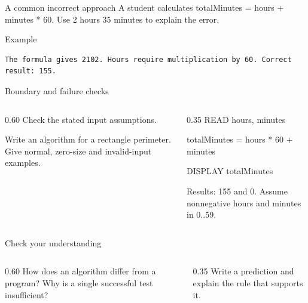 \documentclass[10pt,aspectratio=169]{beamer}
\begin{document}
\begin{frame}[fragile,t]{A common incorrect approach}
A student calculates totalMinutes = hours + minutes * 60. Use 2 hours 35 minutes to explain the error.
\vspace{1mm}\begin{block}{Example}
\begin{lstlisting}
The formula gives 2102. Hours require multiplication by 60. Correct result: 155.
\end{lstlisting}
\end{block}
\end{frame}

\begin{frame}[fragile,t]{Boundary and failure checks}
\begin{columns}[T,onlytextwidth]\begin{column}{0.60\textwidth}
Check the stated input assumptions.

Write an algorithm for a rectangle perimeter. Give normal, zero-size and invalid-input examples.
\end{column}\begin{column}{0.35\textwidth}\small
READ hours, minutes\par totalMinutes = hours * 60 + minutes\par DISPLAY totalMinutes\par Results: 155 and 0. Assume nonnegative hours and minutes in 0..59.
\end{column}\end{columns}
\end{frame}

\begin{frame}[fragile,t]{Check your understanding}
\begin{columns}[T,onlytextwidth]\begin{column}{0.60\textwidth}
How does an algorithm differ from a program? Why is a single successful test insufficient?
\end{column}\begin{column}{0.35\textwidth}\small
Write a prediction and explain the rule that supports it.
\end{column}\end{columns}
\end{frame}
\end{document}
